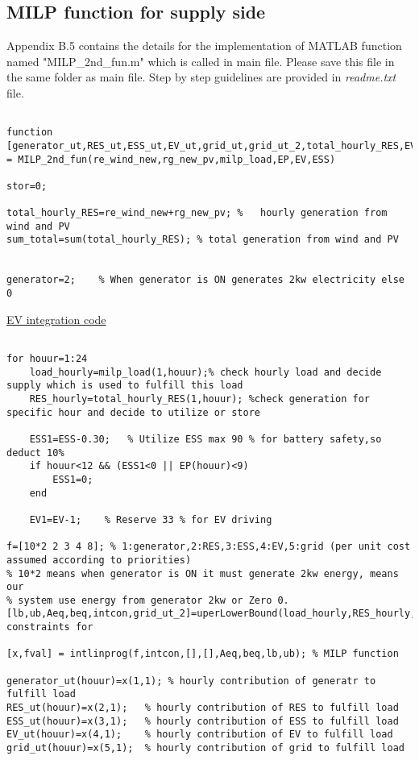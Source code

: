 \newpage
\subsection{MILP function for supply side}
Appendix B.5 contains the details for the implementation of MATLAB function named "MILP\_2nd\_fun.m" which is called in main file. Please save this file in the same folder as main file. Step by step guidelines are provided in \textit{readme.txt} file.\par

\begin{linenumbers}
\begin{lstlisting}

function [generator_ut,RES_ut,ESS_ut,EV_ut,grid_ut,grid_ut_2,total_hourly_RES,EV_charging] = MILP_2nd_fun(re_wind_new,rg_new_pv,milp_load,EP,EV,ESS)

stor=0;

total_hourly_RES=re_wind_new+rg_new_pv; %   hourly generation from wind and PV
sum_total=sum(total_hourly_RES); % total generation from wind and PV


generator=2;    % When generator is ON generates 2kw electricity else 0

\end{lstlisting}
\hypertarget{ev1_code}{}
\hyperlink{ev1_text}{EV integration code}
\begin{lstlisting}

for houur=1:24
    load_hourly=milp_load(1,houur);% check hourly load and decide supply which is used to fulfill this load
    RES_hourly=total_hourly_RES(1,houur); %check generation for specific hour and decide to utilize or store

    ESS1=ESS-0.30;   % Utilize ESS max 90 % for battery safety,so deduct 10%
    if houur<12 && (ESS1<0 || EP(houur)<9)
        ESS1=0;
    end

    EV1=EV-1;    % Reserve 33 % for EV driving

f=[10*2 2 3 4 8]; % 1:generator,2:RES,3:ESS,4:EV,5:grid (per unit cost assumed according to priorities)
% 10*2 means when generator is ON it must generate 2kw energy, means our
% system use energy from generator 2kw or Zero 0.
[lb,ub,Aeq,beq,intcon,grid_ut_2]=uperLowerBound(load_hourly,RES_hourly,ESS1,EV1,houur);% constraints for

[x,fval] = intlinprog(f,intcon,[],[],Aeq,beq,lb,ub); % MILP function

generator_ut(houur)=x(1,1); % hourly contribution of generatr to fulfill load
RES_ut(houur)=x(2,1);   % hourly contribution of RES to fulfill load
ESS_ut(houur)=x(3,1);   % hourly contribution of ESS to fulfill load
EV_ut(houur)=x(4,1);    % hourly contribution of EV to fulfill load
grid_ut(houur)=x(5,1);  % hourly contribution of grid to fulfill load



\end{lstlisting}
\end{linenumbers}
